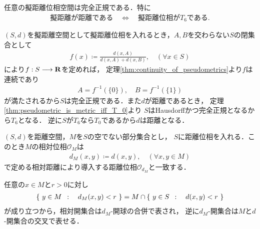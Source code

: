 	\begin{screen}
		\begin{thm}[擬距離空間は完全正規]
			任意の擬距離位相空間は完全正規である．特に
			\begin{align}
				\mbox{擬距離が距離である} \quad \Longleftrightarrow \quad
				\mbox{擬距離位相が$T_6$である}.
			\end{align}
		\end{thm}
	\end{screen}
	
	\begin{prf}
		$(S,d)$を擬距離空間として擬距離位相を入れるとき，$A,B$を交わらない$S$の閉集合として
		\begin{align}
			f(x) \coloneqq \frac{d(x,A)}{d(x,A) + d(x,B)},
			\quad (\forall x \in S)
		\end{align}
		により$f:S \longrightarrow \mathbf{R}$を定めれば，
		定理\ref{thm:continuity_of_pseudometrics}より$f$は連続であり
		\begin{align}
			A = f^{-1}(\{0\}),\quad B = f^{-1}(\{1\})
		\end{align}
		が満たされるから$S$は完全正規である．また$d$が距離であるとき，
		定理\ref{thm:pseudometric_is_metric_iff_T_0}より
		$S$はHausdorffかつ完全正規となるから$T_6$となる．
		逆に$S$が$T_6$なら$T_0$であるから$d$は距離となる．
		\QED
	\end{prf}
	
	\begin{screen}
		\begin{thm}[距離空間の部分空間の距離]
			$(S,d)$を距離空間，$M$を$S$の空でない部分集合とし，
			$S$に距離位相を入れる．このとき$M$の相対位相$\mathscr{O}_M$は
			\begin{align}
				d_M(x,y) \coloneqq d(x,y),
				\quad (\forall x,y \in M)
			\end{align}
			で定める相対距離により導入する距離位相$\mathscr{O}_{d_M}$と一致する．
		\end{thm}
	\end{screen}
	
	\begin{prf} 任意の$x \in M$と$r > 0$に対し
		\begin{align}
			\left\{\ y \in M\ \, : \quad d_M(x,y) < r\ \right\}
			= M \cap \left\{\ y \in S\ \, : \quad d(x,y) < r\ \right\}
		\end{align}
		が成り立つから，相対開集合は$d_M$-開球の合併で表され，
		逆に$d_M$-開集合は$M$と$d$-開集合の交叉で表せる．
		\QED
	\end{prf}
	
